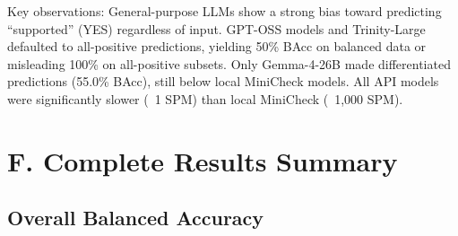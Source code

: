 \documentclass[12pt, letterpaper]{article}
\begin{document}
Key observations: General-purpose LLMs show a strong bias toward predicting ``supported'' (YES) regardless of input. GPT-OSS models and Trinity-Large defaulted to all-positive predictions, yielding 50\% BAcc on balanced data or misleading 100\% on all-positive subsets. Only Gemma-4-26B made differentiated predictions (55.0\% BAcc), still below local MiniCheck models. All API models were significantly slower (~1 SPM) than local MiniCheck (~1,000 SPM).

\section*{F. Complete Results Summary}

\subsection*{Overall Balanced Accuracy}
\end{document}
